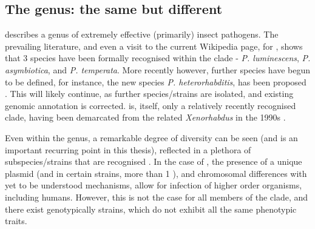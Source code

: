\subsection{The \Pa{} genus: the same but different}
\Pa{} describes a genus of extremely effective (primarily) insect pathogens. The prevailing literature, and even a visit to the current Wikipedia page, for \Pa{}, shows that 3 species have been formally recognised within the clade - \textit{P. luminescens}, \textit{P. asymbiotica}, and \textit{P. temperata}. More recently however, further species have begun to be defined, for instance, the new species \textit{P. heterorhabditis}, has been proposed \citep{Naidoo2015}. This will likely continue, as further species/strains are isolated, and existing genomic annotation is corrected. \Pa{} is, itself, only a relatively recently recognised clade, having been demarcated from the related \textit{Xenorhabdus} in the 1990s \citep{Saux1999a,Boemare1993}.

Even within the genus, a remarkable degree of diversity can be seen (and is an important recurring point in this thesis), reflected in a plethora of subspecies/strains that are recognised \citep{Peat2010}. In the case of \Pasy, the presence of a unique plasmid (and in certain strains, more than 1 \citep{Wilkinson2010a}), and chromosomal differences with yet to be understood mechanisms, allow for infection of higher order organisms, including humans. However, this is not the case for all members of the \Pasy{} clade, and there exist genotypically \Pasy{} strains, which do not exhibit all the same phenotypic traits.

